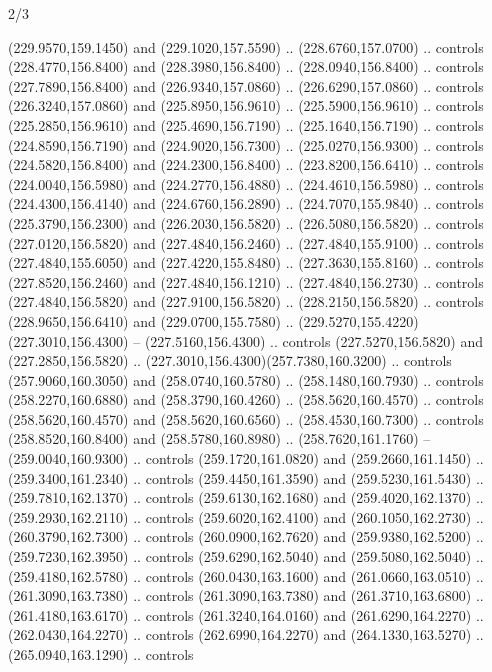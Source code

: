 \begin{flagdescription}{2/3}
\begin{scope}[xshift=0.5\flaglength,yshift=0.5\flagwidth,scale=\flagwidth/259.2]
\begin{scope}[y=0.8pt, x=0.8pt, yscale=-1,shift={(-243,-162)}]
      (229.9570,159.1450) and (229.1020,157.5590) .. (228.6760,157.0700) .. controls
      (228.4770,156.8400) and (228.3980,156.8400) .. (228.0940,156.8400) .. controls
      (227.7890,156.8400) and (226.9340,157.0860) .. (226.6290,157.0860) .. controls
      (226.3240,157.0860) and (225.8950,156.9610) .. (225.5900,156.9610) .. controls
      (225.2850,156.9610) and (225.4690,156.7190) .. (225.1640,156.7190) .. controls
      (224.8590,156.7190) and (224.9020,156.7300) .. (225.0270,156.9300) .. controls
      (224.5820,156.8400) and (224.2300,156.8400) .. (223.8200,156.6410) .. controls
      (224.0040,156.5980) and (224.2770,156.4880) .. (224.4610,156.5980) .. controls
      (224.4300,156.4140) and (224.6760,156.2890) .. (224.7070,155.9840) .. controls
      (225.3790,156.2300) and (226.2030,156.5820) .. (226.5080,156.5820) .. controls
      (227.0120,156.5820) and (227.4840,156.2460) .. (227.4840,155.9100) .. controls
      (227.4840,155.6050) and (227.4220,155.8480) .. (227.3630,155.8160) .. controls
      (227.8520,156.2460) and (227.4840,156.1210) .. (227.4840,156.2730) .. controls
      (227.4840,156.5820) and (227.9100,156.5820) .. (228.2150,156.5820) .. controls
      (228.9650,156.6410) and (229.0700,155.7580) ..
      (229.5270,155.4220)(227.3010,156.4300) -- (227.5160,156.4300) .. controls
      (227.5270,156.5820) and (227.2850,156.5820) ..
      (227.3010,156.4300)(257.7380,160.3200) .. controls (257.9060,160.3050) and
      (258.0740,160.5780) .. (258.1480,160.7930) .. controls (258.2270,160.6880) and
      (258.3790,160.4260) .. (258.5620,160.4570) .. controls (258.5620,160.4570) and
      (258.5620,160.6560) .. (258.4530,160.7300) .. controls (258.8520,160.8400) and
      (258.5780,160.8980) .. (258.7620,161.1760) -- (259.0040,160.9300) .. controls
      (259.1720,161.0820) and (259.2660,161.1450) .. (259.3400,161.2340) .. controls
      (259.4450,161.3590) and (259.5230,161.5430) .. (259.7810,162.1370) .. controls
      (259.6130,162.1680) and (259.4020,162.1370) .. (259.2930,162.2110) .. controls
      (259.6020,162.4100) and (260.1050,162.2730) .. (260.3790,162.7300) .. controls
      (260.0900,162.7620) and (259.9380,162.5200) .. (259.7230,162.3950) .. controls
      (259.6290,162.5040) and (259.5080,162.5040) .. (259.4180,162.5780) .. controls
      (260.0430,163.1600) and (261.0660,163.0510) .. (261.3090,163.7380) .. controls
      (261.3090,163.7380) and (261.3710,163.6800) .. (261.4180,163.6170) .. controls
      (261.3240,164.0160) and (261.6290,164.2270) .. (262.0430,164.2270) .. controls
      (262.6990,164.2270) and (264.1330,163.5270) .. (265.0940,163.1290) .. controls

\end{scope}
\end{scope}
\end{flagdescription}
